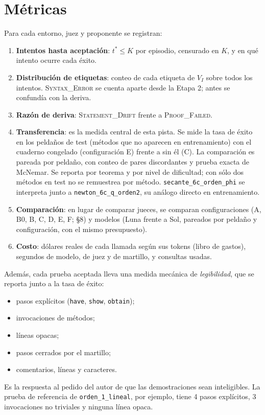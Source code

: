 \documentclass[11pt,a4paper]{article}
\begin{document}
\section{Métricas}

Para cada entorno, juez y proponente se registran:

\begin{enumerate}
  \item \textbf{Intentos hasta aceptación}: $t^* \le K$ por episodio, censurado en $K$, y en qué intento ocurre cada éxito.
  \item \textbf{Distribución de etiquetas}: conteo de cada etiqueta de $V_I$ sobre todos los intentos. \textsc{Syntax\_Error} se cuenta aparte desde la Etapa 2; antes se confundía con la deriva.
  \item \textbf{Razón de deriva}: \textsc{Statement\_Drift} frente a \textsc{Proof\_Failed}.
  \item \textbf{Transferencia}: es la medida central de esta pista. Se mide la tasa de éxito en los peldaños de test (métodos que no aparecen en entrenamiento) con el cuaderno congelado (configuración E) frente a sin él (C). La comparación es pareada por peldaño, con conteo de pares discordantes y prueba exacta de McNemar. Se reporta por teorema y por nivel de dificultad; con sólo dos métodos en test no se remuestrea por método. \texttt{secante\_6c\_orden\_phi} se interpreta junto a \texttt{newton\_6c\_q\_orden2}, su análogo directo en entrenamiento.
  \item \textbf{Comparación}: en lugar de comparar jueces, se comparan configuraciones (A, B0, B, C, D, E, F; §8) y modelos (Luna frente a Sol, pareados por peldaño y configuración, con el mismo presupuesto).
  \item \textbf{Costo}: dólares reales de cada llamada según sus tokens (libro de gastos), segundos de modelo, de juez y de martillo, y consultas usadas.
\end{enumerate}

Además, cada prueba aceptada lleva una medida mecánica de \emph{legibilidad}, que se reporta junto a la tasa de éxito:
\begin{itemize}
  \item pasos explícitos (\texttt{have}, \texttt{show}, \texttt{obtain});
  \item invocaciones de métodos;
  \item líneas opacas;
  \item pasos cerrados por el martillo;
  \item comentarios, líneas y caracteres.
\end{itemize}
Es la respuesta al pedido del autor de que las demostraciones sean inteligibles. La prueba de referencia de \texttt{orden\_1\_lineal}, por ejemplo, tiene 4 pasos explícitos, 3 invocaciones no triviales y ninguna línea opaca.
\end{document}
